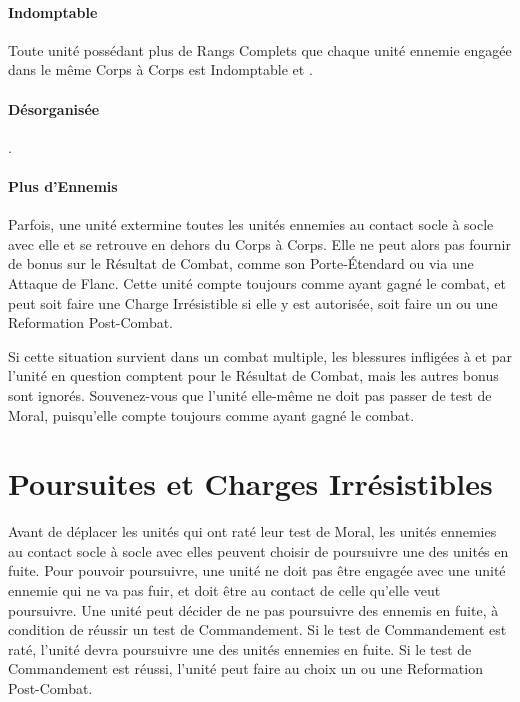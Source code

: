 \paragraph{Indomptable}

Toute unité possédant plus de Rangs Complets que chaque unité ennemie engagée dans le même Corps à Corps est Indomptable et .

\paragraph{Désorganisée}

.

\paragraph{Plus d'Ennemis}

Parfois, une unité extermine toutes les unités ennemies au contact socle à socle avec elle et se retrouve en dehors du Corps à Corps. Elle ne peut alors pas fournir de bonus sur le Résultat de Combat, comme son Porte-Étendard ou via une Attaque de Flanc. Cette unité compte toujours comme ayant gagné le combat, et peut soit faire une Charge Irrésistible si elle y est autorisée, soit faire un  ou une Reformation Post-Combat.

Si cette situation survient dans un combat multiple, les blessures infligées à et par l'unité en question comptent pour le Résultat de Combat, mais les autres bonus sont ignorés. Souvenez-vous que l'unité elle-même ne doit pas passer de test de Moral, puisqu'elle compte toujours comme ayant gagné le combat.

\newpage
\section{Poursuites et Charges Irrésistibles}

Avant de déplacer les unités qui ont raté leur test de Moral, les unités ennemies au contact socle à socle avec elles peuvent choisir de poursuivre une des unités en fuite. Pour pouvoir poursuivre, une unité ne doit pas être engagée avec une unité ennemie qui ne va pas fuir, et doit être au contact de celle qu'elle veut poursuivre. Une unité peut décider de ne pas poursuivre des ennemis en fuite, à condition de réussir un test de Commandement. Si le test de Commandement est raté, l'unité devra poursuivre une des unités ennemies en fuite. Si le test de Commandement est réussi, l'unité peut faire au choix un  ou une Reformation Post-Combat. 

